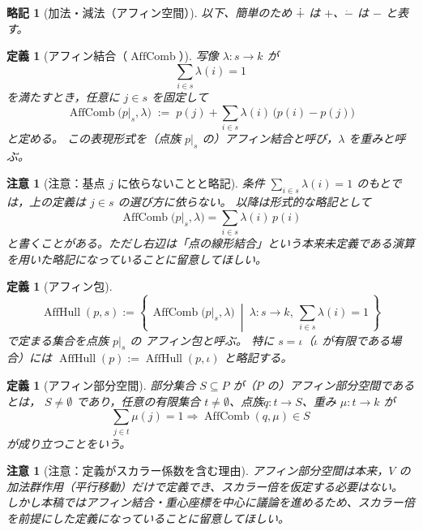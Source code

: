\documentclass[a4paper,12pt]{bxjsbook}
\theoremstyle{theorem}
\newtheorem{definition}[theorem]{定義}
\newtheorem{remark}[theorem]{注意}
\newtheorem{abbreviation}[theorem]{略記}
\newcommand{\dotminus}{\mathbin{\dot{-}}}
\DeclareMathOperator{\AffHull}{AffHull}
\DeclareMathOperator{\AffComb}{AffComb}
\begin{document}
    \begin{abbreviation}[加法・減法（アフィン空間）]
        以下、簡単のため $\dotplus$ は $+$、$\dotminus$ は $-$ と表す。
    \end{abbreviation}

    \begin{definition}[アフィン結合（\texorpdfstring{$\AffComb$}{AffComb}）]
        写像 $\lambda:s\to k$ が
        \[
          \sum_{i\in s}\lambda(i)=1
        \]
        を満たすとき，任意に $j\in s$ を固定して
        \[
          \AffComb\bigl(p|_s,\lambda\bigr)
          \;:=\;
          p(j)+\sum_{i\in s}\lambda(i)\,\bigl(p(i)-p(j)\bigr)
        \]
        と定める。
        この表現形式を（点族 $p|_s$ の）\emph{アフィン結合}と呼び，$\lambda$ を\emph{重み}と呼ぶ。
    \end{definition}
      
    \begin{remark}[注意：基点 $j$ に依らないことと略記]
        条件 $\sum_{i\in s}\lambda(i)=1$ のもとでは，上の定義は $j\in s$ の選び方に依らない。
        以降は形式的な略記として
        \[
          \AffComb\bigl(p|_s,\lambda\bigr)=\sum_{i\in s}\lambda(i)\,p(i)
        \]
        と書くことがある。ただし右辺は「点の線形結合」という本来未定義である演算を用いた略記になっていることに留意してほしい。
    \end{remark}

    \begin{definition}[アフィン包]
        \[
          \AffHull(p,s)
          :=
          \left\{\,
            \AffComb\bigl(p|_s,\lambda\bigr)
            \ \middle|\
            \lambda:s\to k,\ \sum_{i\in s}\lambda(i)=1
          \,\right\}
        \]
        で定まる集合を点族 $p|_s$ の \emph{アフィン包}と呼ぶ。
        特に $s=\iota$（$\iota$ が有限である場合）には $\AffHull(p):=\AffHull(p,\iota)$ と略記する。
    \end{definition}

    \begin{definition}[アフィン部分空間]
        部分集合 $S\subseteq P$ が（$P$ の）\emph{アフィン部分空間}であるとは，
        $S\neq\emptyset$ であり，任意の有限集合 $t\neq \emptyset$、点族$q:t\to S$、重み $\mu:t\to k$ が
        \[
        \sum_{j\in t}\mu(j)=1 \Longrightarrow \AffComb(q,\mu)\in S
        \]
        が成り立つことをいう。
    \end{definition}
      
    \begin{remark}[注意：定義がスカラー係数を含む理由]
        アフィン部分空間は本来，$V$ の加法群作用（平行移動）だけで定義でき、スカラー倍を仮定する必要はない。
        しかし本稿ではアフィン結合・重心座標を中心に議論を進めるため、スカラー倍を前提にした定義になっていることに留意してほしい。
    \end{remark}
\end{document}
